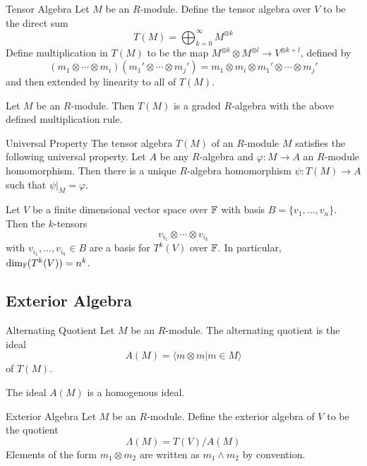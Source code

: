 \documentclass[a4paper]{article}
\begin{document}
\begin{defn}{Tensor Algebra}{} Let $M$ be an $R$-module. Define the tensor algebra over $V$ to be the direct sum $$T(M)=\bigoplus_{k=0}^\infty M^{\otimes k}$$ Define multiplication in $T(M)$ to be the map $M^{\otimes k}\otimes M^{\otimes l}\to V^{\otimes k+l}$, defined by $$(m_1\otimes\cdots\otimes m_i)(m_1'\otimes\cdots\otimes m_j')=m_1\otimes m_i\otimes m_1'\otimes\cdots\otimes m_j'$$ and then extended by linearity to all of $T(M)$. 
\end{defn}

\begin{prp}{}{} Let $M$ be an $R$-module. Then $T(M)$ is a graded $R$-algebra with the above defined multiplication rule. 
\end{prp}

\begin{prp}{Universal Property}{} The tensor algebra $T(M)$ of an $R$-module $M$ satisfies the following universal property. Let $A$ be any $R$-algebra and $\varphi:M\to A$ an $R$-module homomorphism. Then there is a unique $R$-algebra homomorphism $\psi:T(M)\to A$ such that $\psi|_M=\varphi$. 
\end{prp}

\begin{prp}{}{} Let $V$ be a finite dimensional vector space over $\mathbb{F}$ with basis $B=\{v_1,\dots,v_n\}$. Then the $k$-tensors $$v_{i_1}\otimes\cdots\otimes v_{i_k}$$ with $v_{i_1},\dots,v_{i_k}\in B$ are a basis for $T^k(V)$ over $\mathbb{F}$. In particular, $\dim_{\mathbb{F}}(T^k(V))=n^k$. 
\end{prp}

\subsection{Exterior Algebra}
\begin{defn}{Alternating Quotient}{} Let $M$ be an $R$-module. The alternating quotient is the ideal $$A(M)=\langle m\otimes m|m\in M\rangle$$ of $T(M)$. 
\end{defn}

\begin{lmm}{}{} The ideal $A(M)$ is a homogenous ideal. 
\end{lmm}

\begin{defn}{Exterior Algebra}{} Let $M$ be an $R$-module. Define the exterior algebra of $V$ to be the quotient $$\Lambda(M)=T(V)/A(M)$$ Elements of the form $m_1\otimes m_2$ are written as $m_1\wedge m_2$ by convention. 
\end{defn}
\end{document}
